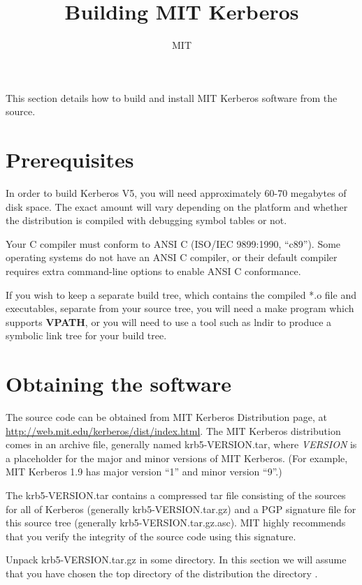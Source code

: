 \documentclass[letterpaper,10pt,english]{sphinxmanual}
\title{Building MIT Kerberos}
\date{ }
\author{MIT}
\begin{document}
\maketitle
\tableofcontents
{}\label{build/index::doc}


This section details how to build and install MIT Kerberos software
from the source.


\chapter{Prerequisites}
\label{build/index:building-kerberos-v5}\label{build/index:prerequisites}\label{build/index:build-v5}
In order to build Kerberos V5, you will need approximately 60-70
megabytes of disk space.  The exact amount will vary depending on the
platform and whether the distribution is compiled with debugging
symbol tables or not.

Your C compiler must conform to ANSI C (ISO/IEC 9899:1990, ``c89'').
Some operating systems do not have an ANSI C compiler, or their
default compiler requires extra command-line options to enable ANSI C
conformance.

If you wish to keep a separate build tree, which contains the compiled
*.o file and executables, separate from your source tree, you will
need a make program which supports \textbf{VPATH}, or you will need to use
a tool such as lndir to produce a symbolic link tree for your build
tree.


\chapter{Obtaining the software}
\label{build/index:obtaining-the-software}
The source code can be obtained from MIT Kerberos Distribution page,
at \href{http://web.mit.edu/kerberos/dist/index.html}{http://web.mit.edu/kerberos/dist/index.html}.
The MIT Kerberos distribution comes in an archive file, generally named
krb5-VERSION.tar, where \emph{VERSION} is a placeholder for the major and minor
versions of MIT Kerberos.  (For example, MIT Kerberos 1.9
has major version ``1'' and minor version ``9''.)

The krb5-VERSION.tar contains a compressed tar file consisting of the
sources for all of Kerberos (generally krb5-VERSION.tar.gz) and
a PGP signature file for this source tree (generally
krb5-VERSION.tar.gz.asc).  MIT highly recommends that you verify
the integrity of the source code using this signature.

Unpack krb5-VERSION.tar.gz in some directory. In this section we will assume
that you have chosen the top directory of the distribution the directory
.
\end{document}
